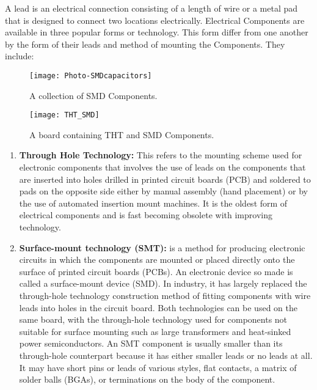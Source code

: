 A lead  is an electrical connection consisting of a length of wire or a metal pad that is designed to connect two locations electrically. Electrical Components are available in three popular forms or technology. This form differ from one another by the form of their leads and method of mounting the Components. They include:



\begin{figure}[p]
\texttt{[image: Photo-SMDcapacitors]}
\centering
\caption{A collection of SMD Components.}
\centering
\label{fig:smd1}


\end{figure}

\begin{figure}[p]

\texttt{[image: THT\_SMD]}
\centering
\caption{A board containing THT and SMD Components.}
\centering
\label{fig:THT_SMD}


\end{figure}
\begin{enumerate}
\item \textbf{Through Hole Technology:} This refers to the mounting scheme used for electronic components that involves the use of leads on the components that are inserted into holes drilled in printed circuit boards (PCB) and soldered to pads on the opposite side either by manual assembly (hand placement) or by the use of automated insertion mount machines. It is the oldest form of electrical components and is fast becoming obsolete with improving technology.
\item \textbf{Surface-mount technology (SMT):} is a method for producing electronic circuits in which the components are mounted or placed directly onto the surface of printed circuit boards (PCBs). An electronic device so made is called a surface-mount device (SMD). In industry, it has largely replaced the through-hole technology construction method of fitting components with wire leads into holes in the circuit board. Both technologies can be used on the same board, with the through-hole technology used for components not suitable for surface mounting such as large transformers and heat-sinked power semiconductors. An SMT component is usually smaller than its through-hole counterpart because it has either smaller leads or no leads at all. It may have short pins or leads of various styles, flat contacts, a matrix of solder balls (BGAs), or terminations on the body of the component. 
\end{enumerate}


